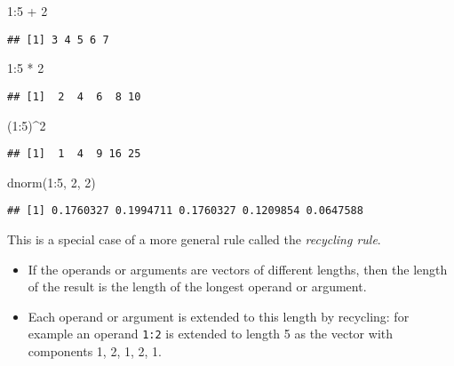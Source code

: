 \documentclass[
]{article}
\newenvironment{Shaded}{\begin{snugshade}}{\end{snugshade}}
\newcommand{\DecValTok}[1]{\textcolor[rgb]{0.00,0.00,0.81}{#1}}
\newcommand{\FunctionTok}[1]{\textcolor[rgb]{0.00,0.00,0.00}{#1}}
\newcommand{\NormalTok}[1]{#1}
\newcommand{\SpecialCharTok}[1]{\textcolor[rgb]{0.00,0.00,0.00}{#1}}
\providecommand{\tightlist}{%
  \setlength{\itemsep}{0pt}\setlength{\parskip}{0pt}}
\begin{document}
\begin{Shaded}
\begin{Highlighting}[]
\DecValTok{1}\SpecialCharTok{:}\DecValTok{5} \SpecialCharTok{+} \DecValTok{2}
\end{Highlighting}
\end{Shaded}

\begin{verbatim}
## [1] 3 4 5 6 7
\end{verbatim}

\begin{Shaded}
\begin{Highlighting}[]
\DecValTok{1}\SpecialCharTok{:}\DecValTok{5} \SpecialCharTok{*} \DecValTok{2}
\end{Highlighting}
\end{Shaded}

\begin{verbatim}
## [1]  2  4  6  8 10
\end{verbatim}

\begin{Shaded}
\begin{Highlighting}[]
\NormalTok{(}\DecValTok{1}\SpecialCharTok{:}\DecValTok{5}\NormalTok{)}\SpecialCharTok{\^{}}\DecValTok{2}
\end{Highlighting}
\end{Shaded}

\begin{verbatim}
## [1]  1  4  9 16 25
\end{verbatim}

\begin{Shaded}
\begin{Highlighting}[]
\FunctionTok{dnorm}\NormalTok{(}\DecValTok{1}\SpecialCharTok{:}\DecValTok{5}\NormalTok{, }\DecValTok{2}\NormalTok{, }\DecValTok{2}\NormalTok{)}
\end{Highlighting}
\end{Shaded}

\begin{verbatim}
## [1] 0.1760327 0.1994711 0.1760327 0.1209854 0.0647588
\end{verbatim}

This is a special case of a more general rule called the \emph{recycling
rule}.

\begin{itemize}
\tightlist
\item
  If the operands or arguments are vectors of different lengths, then
  the length of the result is the length of the longest operand or
  argument.
\item
  Each operand or argument is extended to this length by recycling: for
  example an operand \texttt{1:2} is extended to length 5 as the vector
  with components 1, 2, 1, 2, 1.
\end{itemize}
\end{document}
